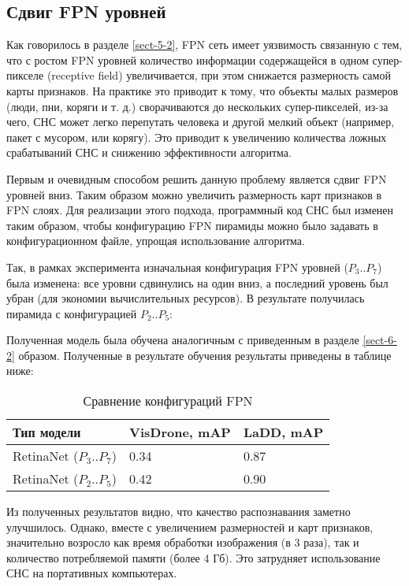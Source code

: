 \subsection{Сдвиг FPN уровней} \label{sect-6-3}

Как говорилось в разделе \ref{sect-5-2}, FPN сеть имеет уязвимость связанную с тем, что с ростом FPN уровней количество информации содержащейся в одном супер-пикселе (receptive field) увеличивается, при этом снижается размерность самой карты признаков. На практике это приводит к тому, что объекты малых размеров (люди, пни, коряги и т. д.) сворачиваются до нескольких супер-пикселей, из-за чего, СНС может легко перепутать человека и другой мелкий объект (например, пакет с мусором, или корягу). Это приводит к увеличению количества ложных срабатываний СНС и снижению эффективности алгоритма.

Первым и очевидным способом решить данную проблему является сдвиг FPN уровней вниз. Таким образом можно увеличить размерность карт признаков в FPN слоях. Для реализации этого подхода, программный код СНС был изменен таким образом, чтобы конфигурацию FPN пирамиды можно было задавать в конфигурационном файле, упрощая использование алгоритма. 

Так, в рамках эксперимента изначальная конфигурация FPN уровней ($P_3..P_7$) была изменена: все уровни сдвинулись на один вниз, а последний уровень был убран (для экономии вычислительных ресурсов). В результате получилась пирамида с конфигурацией $P_2..P_5$:


Полученная модель была обучена аналогичным с приведенным в разделе \ref{sect-6-2} образом. Полученные в результате обучения результаты приведены в таблице ниже:

\begin{table}[H]
    \caption{Сравнение конфигураций FPN}\label{leaderboard-3}
    \begin{tabular}{|p{5cm}|p{5cm}|p{5cm}|}
        \hline
        {Тип модели} & {VisDrone, mAP} & {LaDD, mAP} \\
        \hline
        RetinaNet ($P_3..P_7$) & 0.34 & 0.87 \\
        \hline
        RetinaNet ($P_2..P_5$) & 0.42 & 0.90 \\
        \hline
    \end{tabular}
\end{table}

Из полученных результатов видно, что качество распознавания заметно улучшилось. Однако, вместе с увеличением размерностей и карт признаков, значительно возросло как время обработки изображения (в 3 раза), так и количество потребляемой памяти (более 4 Гб). Это затрудняет использование СНС на портативных компьютерах.